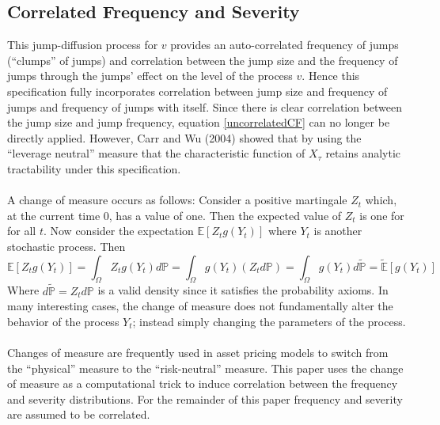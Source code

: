 \documentclass{article}
\theoremstyle{definition}
\begin{document}
\subsection{Correlated Frequency and Severity}
This jump-diffusion process for \(v\) provides an auto-correlated frequency of jumps (``clumps'' of jumps) and correlation between the jump size and the frequency of jumps through the jumps' effect on the level of the process \(v\).  Hence this specification fully incorporates correlation between jump size and frequency of jumps and frequency of jumps with itself.  Since there is clear correlation between the jump size and jump frequency, equation \ref{uncorrelatedCF} can no longer be directly applied.  However, Carr and Wu (2004) showed that by using the ``leverage neutral'' measure that the characteristic function of \(X_\tau\) retains analytic tractability under this specification.  
\\
\\
A change of measure occurs as follows: Consider a positive martingale \(Z_t\) which, at the current time \(0\), has a value of one.  Then the expected value of \(Z_t\) is one for for all \(t\).  Now consider the expectation \(\mathbb{E}[Z_t g(Y_t)]\) where \(Y_t\) is another stochastic process.  Then \[\mathbb{E}[Z_t g(Y_t)]=
\int_\Omega Z_t g(Y_t) d\mathbb{P}=
\int_\Omega g(Y_t) \left(Z_t d\mathbb{P}\right)=
\int_\Omega g(Y_t) d\mathbb{\tilde{P}}=\mathbb{\tilde{E}}[g(Y_t)]\] 
Where \(d\mathbb{\tilde{P}}=Z_t d\mathbb{P}\) is a valid density since it satisfies the probability axioms.  In many interesting cases, the change of measure does not fundamentally alter the behavior of the process \(Y_t\); instead simply changing the parameters of the process. 
\\
\\
Changes of measure are frequently used in asset pricing models to switch from the ``physical'' measure to the ``risk-neutral'' measure.  This paper uses the change of measure as a computational trick to induce correlation between the frequency and severity distributions.  For the remainder of this paper frequency and severity are assumed to be correlated.
\end{document}
